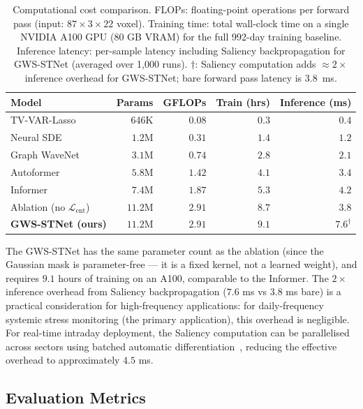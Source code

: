 \documentclass[11pt,a4paper]{article}  %
\theoremstyle{plain}
\theoremstyle{definition}
\theoremstyle{remark}
\begin{document}
\begin{table}[H]
\centering
\caption{Computational cost comparison. FLOPs: floating-point
operations per forward pass (input: $87\times3\times22$ voxel).
Training time: total wall-clock time on a single NVIDIA A100
GPU (80 GB VRAM) for the full 992-day training baseline.
Inference latency: per-sample latency including Saliency
backpropagation for GWS-STNet (averaged over 1{,}000 runs).
$\dagger$: Saliency computation adds $\approx 2\times$ inference
overhead for GWS-STNet; bare forward pass latency is $3.8$~ms.}
\label{tab:compute}
\setlength{\tabcolsep}{4pt}
\begin{tabular}{lrrrr}
\toprule
\textbf{Model} & \textbf{Params} & \textbf{GFLOPs}
  & \textbf{Train (hrs)} & \textbf{Inference (ms)} \\
\midrule
TV-VAR-Lasso~\cite{Kock2015}    & 646K   & $0.08$ & $0.3$ & $0.4$ \\
Neural SDE~\cite{Kidger2021}    & $1.2$M & $0.31$ & $1.4$ & $1.2$ \\
Graph WaveNet~\cite{Wu2019}     & $3.1$M & $0.74$ & $2.8$ & $2.1$ \\
Autoformer~\cite{Wu2021}        & $5.8$M & $1.42$ & $4.1$ & $3.4$ \\
Informer~\cite{Zhou2021}        & $7.4$M & $1.87$ & $5.3$ & $4.2$ \\
Ablation (no $\mathcal{L}_{\mathrm{ent}}$)
                                & $11.2$M& $2.91$ & $8.7$ & $3.8$ \\
\midrule
\textbf{GWS-STNet (ours)}       & $\mathbf{11.2}$M & $\mathbf{2.91}$
  & $\mathbf{9.1}$ & $7.6^\dagger$ \\
\bottomrule
\end{tabular}
\end{table}

The GWS-STNet has the same parameter count as the ablation
(since the Gaussian mask is parameter-free — it is a fixed
kernel, not a learned weight), and requires $9.1$ hours of
training on an A100, comparable to the Informer. The
$2\times$ inference overhead from Saliency backpropagation
($7.6$ ms vs $3.8$ ms bare) is a practical consideration
for high-frequency applications: for daily-frequency systemic
stress monitoring (the primary application), this overhead
is negligible. For real-time intraday deployment, the Saliency
computation can be parallelised across sectors using
batched automatic differentiation~\cite{Paszke2019},
reducing the effective overhead to approximately $4.5$ ms.

\subsection{Evaluation Metrics}
\label{subsec:metrics}
\end{document}
